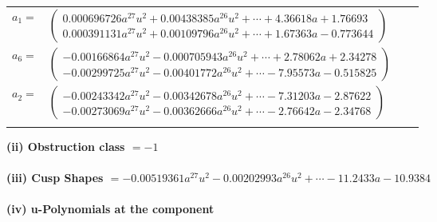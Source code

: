 \documentclass[1p]{elsarticle_modified}
\theoremstyle{definition}
\begin{document}
\begin{tabular}{m{7pt} m{180pt} m{7pt} m{180pt} }
\flushright $a_{1}=$&$\begin{pmatrix}0.000696726 a^{27} u^{2}+0.00438385 a^{26} u^{2}+\cdots+4.36618 a+1.76693\\0.000391131 a^{27} u^{2}+0.00109796 a^{26} u^{2}+\cdots+1.67363 a-0.773644\end{pmatrix}$ \\
\flushright $a_{6}=$&$\begin{pmatrix}-0.00166864 a^{27} u^{2}-0.000705943 a^{26} u^{2}+\cdots+2.78062 a+2.34278\\-0.00299725 a^{27} u^{2}-0.00401772 a^{26} u^{2}+\cdots-7.95573 a-0.515825\end{pmatrix}$ \\
\flushright $a_{2}=$&$\begin{pmatrix}-0.00243342 a^{27} u^{2}-0.00342678 a^{26} u^{2}+\cdots-7.31203 a-2.87622\\-0.00273069 a^{27} u^{2}-0.00362666 a^{26} u^{2}+\cdots-2.76642 a-2.34768\end{pmatrix}$\\&\end{tabular}
\flushleft \textbf{(ii) Obstruction class $= -1$}\\~\\
\flushleft \textbf{(iii) Cusp Shapes $= -0.00519361 a^{27} u^{2}-0.00202993 a^{26} u^{2}+\cdots-11.2433 a-10.9384$}\\~\\
\newpage\renewcommand{\arraystretch}{1}
\flushleft \textbf{(iv) u-Polynomials at the component}\newline \\
\end{document}
